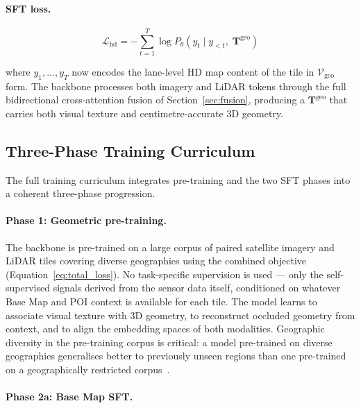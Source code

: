 \documentclass{book}
\begin{document}
\paragraph{SFT loss.}

\begin{equation}
  \mathcal{L}_{\text{hd}} =
    -\sum_{t=1}^{T}
    \log P_\theta\!\left(
      y_t \mid y_{<t},\;
      \mathbf{T}^{\text{geo}}
    \right)
  \label{eq:hdmap_sft_loss}
\end{equation}

where $y_1, \ldots, y_T$ now encodes the lane-level HD map
content of the tile in $\mathcal{V}_{\text{geo}}$ form.  The
backbone processes both imagery and LiDAR tokens through the
full bidirectional cross-attention fusion of
Section~\ref{sec:fusion}, producing a $\mathbf{T}^{\text{geo}}$
that carries both visual texture and centimetre-accurate 3D
geometry.

\subsection{Three-Phase Training Curriculum}
\label{sec:curriculum}

The full training curriculum integrates pre-training and the
two SFT phases into a coherent three-phase progression.

\paragraph{Phase 1: Geometric pre-training.}

The backbone is pre-trained on a large corpus of paired
satellite imagery and LiDAR tiles covering diverse
geographies using the combined objective
(Equation~\eqref{eq:total_loss}).  No task-specific
supervision is used --- only the self-supervised signals
derived from the sensor data itself, conditioned on
whatever Base Map and POI context is available for each
tile.  The model learns to associate visual texture with
3D geometry, to reconstruct occluded geometry from context,
and to align the embedding spaces of both modalities.
Geographic diversity in the pre-training corpus is critical:
a model pre-trained on diverse geographies generalises
better to previously unseen regions than one pre-trained
on a geographically restricted corpus~\cite{kaplan2020scaling}.

\paragraph{Phase 2a: Base Map SFT.}
\end{document}
